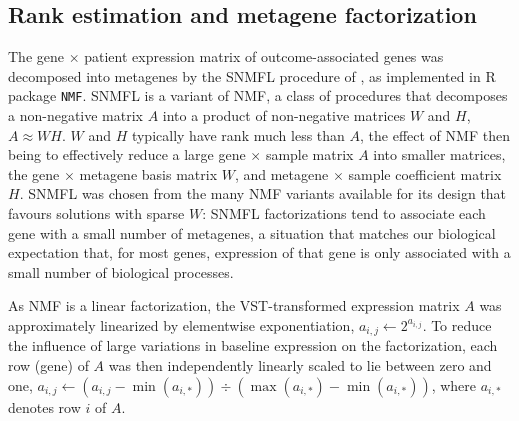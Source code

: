 \documentclass[dissertation.tex]{subfiles}
\begin{document}
\subsection{Rank estimation and metagene factorization}
\label{subsec:sigs-nmf}
The gene $\times$ patient expression matrix of outcome-associated genes was decomposed into metagenes by the \gls{SNMFL} procedure of \cite{Kim2007}, as implemented in R package \texttt{NMF}.  \gls{SNMFL} is a variant of \gls{NMF}, a class of procedures that decomposes a non-negative matrix $A$ into a product of non-negative matrices $W$ and $H$, $A \approx WH$.  $W$ and $H$ typically have rank much less than $A$, the effect of \gls{NMF} then being to effectively reduce a large gene $\times$ sample matrix $A$ into smaller matrices, the gene $\times$ metagene basis matrix $W$, and metagene $\times$ sample coefficient matrix $H$.  \gls{SNMFL} was chosen from the many \gls{NMF} variants available for its design that favours solutions with sparse $W$: \gls{SNMFL} factorizations tend to associate each gene with a small number of metagenes, a situation that matches our biological expectation that, for most genes, expression of that gene is only associated with a small number of biological processes.

As \gls{NMF} is a linear factorization, the \gls{VST}-transformed expression matrix $A$ was approximately linearized by elementwise exponentiation, $a_{i,j} \leftarrow 2^{a_{i,j}}$.  To reduce the influence of large variations in baseline expression on the factorization, each row (gene) of $A$ was then independently linearly scaled to lie between zero and one, $a_{i,j} \leftarrow (a_{i,j} - \min(a_{i,*})) \div (\max(a_{i,*}) - \min(a_{i,*}))$, where $a_{i,*}$ denotes row $i$ of $A$.
\end{document}
